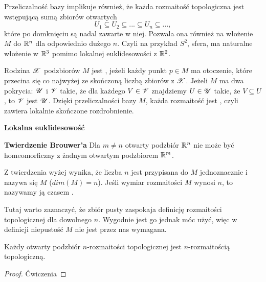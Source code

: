 Przeliczalność bazy implikuje również, że każda rozmaitość topologiczna jest wstępującą sumą zbiorów otwartych
$$U_1\subseteq U_2\subseteq...\subseteq U_n\subseteq...,$$
które po domknięciu są nadal zawarte w niej. Pozwala ona również na włożenie $M$ do $\mathbb{R}^n$ dla odpowiednio dużego $n$. Czyli na przykład $S^2$, sfera, ma naturalne włożenie w $\mathbb{R}^3$ pomimo lokalnej euklidesowości z $\mathbb{R}^2$.

Rodzina $\mathcal{X}$ podzbiorów $M$ jest , jeżeli każdy punkt $p\in M$ ma otoczenie, które przecina się co najwyżej ze skończoną liczbą zbiorów z $\mathcal{X}$. Jeżeli $M$ ma dwa pokrycia: $\mathcal{U}$ i $\mathcal{V}$ takie, że dla każdego $V\in\mathcal{V}$ znajdziemy $U\in\mathcal{U}$ takie, że $V\subseteq U$, to $\mathcal{V}$ jest  $\mathcal{U}$. Dzięki przeliczalności bazy $M$, każda rozmaitość jest , czyli zawiera lokalnie skończone rozdrobnienie.

\textbf{Lokalna euklidesowość}

\begin{theorem}\label{twierdzebie brouwer'a} \textbf{\color{orange}Twierdzenie Brouwer'a} Dla $m\neq n$ otwarty podzbiór $\mathbb{R}^n$ nie może być homeomorficzny z żadnym otwartym podzbiorem $\mathbb{R}^m$.
\end{theorem}

Z twierdzenia wyżej wynika, że liczba $n$ jest przypisana do $M$ jednoznacznie i nazywa się  $M$ ($dim(M)=n$). Jeśli wymiar rozmaitości $M$ wynosi $n$, to nazywamy ją czasem .

Tutaj warto zaznaczyć, że zbiór pusty zaspokaja definicję rozmaitości topologicznej dla dowolnego $n$. Wygodnie jest go jednak móc użyć, więc w definicji niepustość $M$ nie jest przez nas wymagana.

\begin{remark}
  Każdy otwarty podzbiór $n$-rozmaitości topologicznej jest $n$-rozmaitością topologiczną.
\end{remark}

\begin{proof} Ćwiczenia \end{proof}

